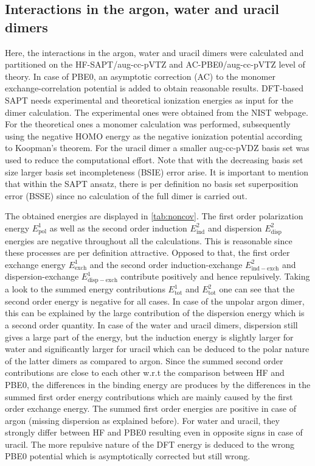 \documentclass[a4paper,12pt]{scrartcl}
\newcommand{\m}[1]{\mathrm{#1}}
\begin{document}
\subsection{Interactions in the argon, water and uracil dimers}
%
Here, the interactions in the argon, water and uracil dimers were calculated and partitioned on the HF-SAPT/aug-cc-pVTZ\autocite[]{aug-cc-pvxz,aug-cc-pvxz-al_ar} and AC-PBE0\autocite[]{pbe0}/aug-cc-pVTZ level of theory. In case of PBE0, an asymptotic correction (AC) to the monomer exchange-correlation potential is added to obtain reasonable results. DFT-based SAPT needs experimental and theoretical ionization energies as input for the dimer calculation. The experimental ones were obtained from the NIST webpage\autocite[]{nist}. For the theoretical ones a monomer calculation was performed, subsequently using the negative HOMO energy as the negative ionization potential according to Koopman's theorem. For the uracil dimer a smaller aug-cc-pVDZ basis set was used to reduce the computational effort. Note that with the decreasing basis set size larger basis set incompleteness (BSIE) error arise. It is important to mention that within the SAPT ansatz, there is per definition no basis set superposition error (BSSE) since no calculation of the full dimer is carried out.

The obtained energies are displayed in \autoref{tab:noncov}. The first order polarization energy $ E^1_\m{pol} $ as well as the second order induction $ E^2_\m{ind} $ and dispersion $ E^2_\m{disp} $ energies are negative throughout all the calculations. This is reasonable since these processes are per definition attractive. Opposed to that, the first order exchange energy $ E^1_\m{exch} $ and the second order induction-exchange $ E^2_\m{ind-exch} $ and dispersion-exchange $ E^1_\m{disp-exch} $ contribute positively and hence repulsively. Taking a look to the summed energy contributions $ E^1_\m{tot} $ and $ E^2_\m{tot} $ one can see that the second order energy is negative for all cases. In case of the unpolar argon dimer, this can be explained by the large contribution of the dispersion energy which is a second order quantity. In case of the water and uracil dimers, dispersion still gives a large part of the energy, but the induction energy is slightly larger for water and significantly larger for uracil which can be deduced to the polar nature of the latter dimers as compared to argon. Since the summed second order contributions are close to each other w.r.t the comparison between HF and PBE0, the differences in the binding energy are produces by the differences in the summed first order energy contributions which are mainly caused by the first order exchange energy. The summed first order energies are positive in case of argon (missing dispersion as explained before). For water and uracil, they strongly differ between HF and PBE0 resulting even in opposite signs in case of uracil. The more repulsive nature of the DFT energy is deduced to the wrong PBE0 potential which is asymptotically corrected but still wrong.
\end{document}
